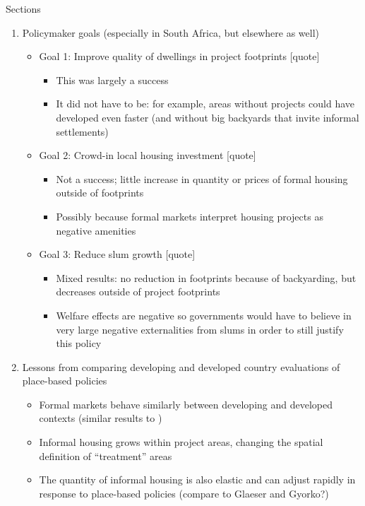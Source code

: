 \documentclass[12pt]{article}
\begin{document}
Sections
\begin{enumerate}

\item Policymaker goals (especially in South Africa, but elsewhere as well)

\begin{itemize}
	\item Goal 1: Improve quality of dwellings in project footprints [quote]
		\begin{itemize}
			\item This was largely a success
			\item It did not have to be: for example, areas without projects could have developed even faster (and without big backyards that invite informal settlements)
		\end{itemize}
	\item Goal 2: Crowd-in local housing investment [quote]
		\begin{itemize}
			\item Not a success; little increase in quantity or prices of formal housing outside of footprints
			\item Possibly because formal markets interpret housing projects as negative amenities
		\end{itemize}
	\item Goal 3: Reduce slum growth [quote]
		\begin{itemize}
			\item Mixed results: no reduction in footprints because of backyarding, but decreases outside of project footprints
			\item Welfare effects are negative so governments would have to believe in very large negative externalities from slums in order to still justify this policy
		\end{itemize}
\end{itemize}

\item Lessons from comparing developing and developed country evaluations of place-based policies

\begin{itemize}
	\item Formal markets behave similarly between developing and developed contexts (similar results to \cite{diamond2016wants})
	\item Informal housing grows within project areas, changing the spatial definition of ``treatment'' areas
	\item The quantity of informal housing is also elastic and can adjust rapidly in response to place-based policies (compare to Glaeser and Gyorko?)
\end{itemize}


\end{enumerate}
\end{document}
